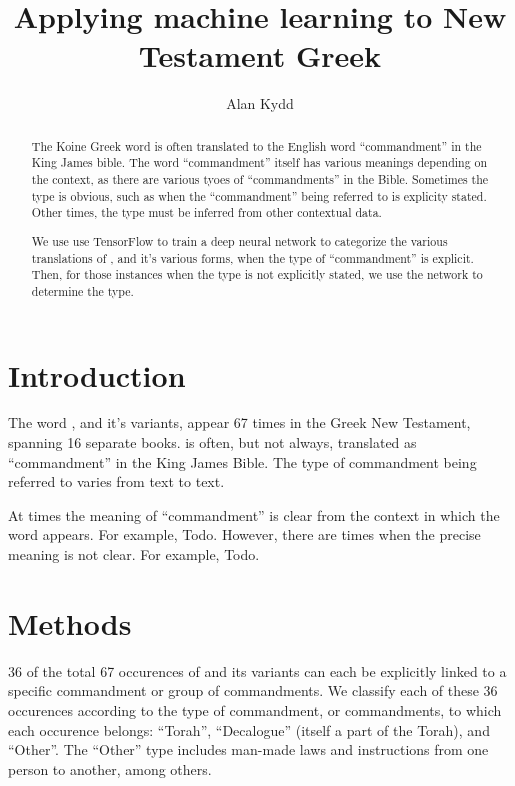 \documentclass{article}
\title{Applying machine learning to New Testament Greek}
\author{Alan Kydd}
\newcommand{\entole}{\textepsilon\textnu\texttau\textomikron\textlambda\textepsilon\xspace}
\begin{document}
\maketitle

\begin{abstract}
The Koine Greek word \entole is often translated to the English
word ``commandment'' in the King James bible.  The word ``commandment'' itself
has various meanings depending on the context, as there are various tyoes of
``commandments'' in the Bible.  Sometimes the type
is obvious, such as when the ``commandment'' being referred to is explicity
stated.  Other times, the type must be inferred from other contextual
data.

We use use TensorFlow to train a deep neural
network to categorize the various translations of \entole,
and it's various forms, when the type of ``commandment'' is explicit. 
Then, for those instances when the type is not explicitly stated,  we use the network 
to determine the type.
\end{abstract}

\section{Introduction}
The word \entole, and it's variants, appear 67 times in the Greek New 
Testament, spanning 16 separate books.  \entole is often, but not always, translated as
``commandment'' in the King James Bible.  The type of commandment being referred to varies from text to 
text.

At times the meaning of ``commandment'' is clear from the context in which
the word appears.  For example, Todo.  However, there are times when the precise
meaning is not clear.  For example, Todo.  

\section{Methods}
36 of the total 67 occurences of \entole and its variants can each be explicitly linked to a specific
commandment or group of commandments.
We classify each of these 36 occurences according to the type of commandment, or commandments,
to which each occurence belongs: ``Torah'', ``Decalogue'' (itself a part
of the Torah), and ``Other''.  The ``Other'' type includes man-made laws
and instructions from one person to another, among others.
\end{document}
